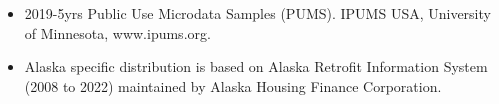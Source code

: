 \begin{itemize}
\item 2019-5yrs Public Use Microdata Samples (PUMS). IPUMS USA, University of Minnesota, www.ipums.org.
\item Alaska specific distribution is based on Alaska Retrofit Information System (2008 to 2022) maintained by Alaska Housing Finance Corporation.
\end{itemize}
